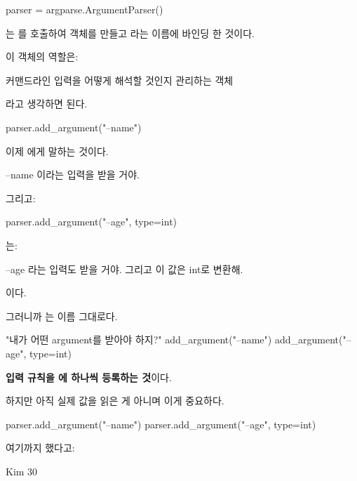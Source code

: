 \begin{dhkcode}
parser = argparse.ArgumentParser()
\end{dhkcode}

는 를 호출하여 객체를 만들고 라는 이름에 바인딩 한 것이다.

이 객체의 역할은:

\begin{dhksmry}[centered]
커맨드라인 입력을 어떻게 해석할 것인지 관리하는 객체
\end{dhksmry}

라고 생각하면 된다.

\begin{dhkcode}
parser.add_argument("--name")
\end{dhkcode}

이제 에게 말하는 것이다.

\begin{dhksmry}[centered]
--name 이라는 입력을 받을 거야.
\end{dhksmry}

그리고:

\begin{dhkcode}
parser.add_argument("--age", type=int)
\end{dhkcode}

는:

\begin{dhksmry}[centered]
--age 라는 입력도 받을 거야. 그리고 이 값은 int로 변환해.
\end{dhksmry}

이다.

그러니까 는 이름 그대로다.

\begin{dhksmry}[centered]
"내가 어떤 argument를 받아야 하지?"
\da
add_argument("--name")
\da
add_argument("--age", type=int)
\end{dhksmry}

\textbf{입력 규칙을 에 하나씩 등록하는 것}이다.

하지만 아직 실제 값을 읽은 게 아니며 이게 중요하다.

\begin{dhkcode}
parser.add_argument("--name")
parser.add_argument("--age", type=int)
\end{dhkcode}

여기까지 했다고:

\begin{dhkzsh}
Kim
30
\end{dhkzsh}

